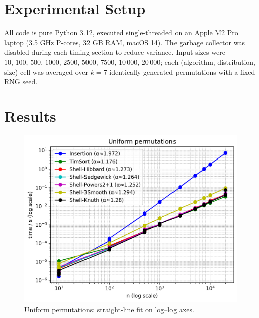 \documentclass[11pt]{article}
\begin{document}
\section{Experimental Setup}
All code is pure Python 3.12, executed single-threaded on an Apple
M2 Pro laptop (3.5 GHz P-cores, 32 GB RAM, macOS 14).
The garbage collector was disabled during each timing section to reduce
variance.  
Input sizes were  
$10,\,100,\,500,\,1000,\,2500,\,5000,\,7500,\,10\,000,\,20\,000$;  
each (algorithm, distribution, size) cell was averaged over
$k=7$ identically generated permutations with a fixed RNG seed.

\section{Results}

\begin{figure}[ht]
  \centering
  \includegraphics[width=\linewidth]{../results/uniform_plot.png}
  \caption{Uniform permutations: straight-line fit on log–log axes.}
  \label{fig:uniform}
\end{figure}
\end{document}
